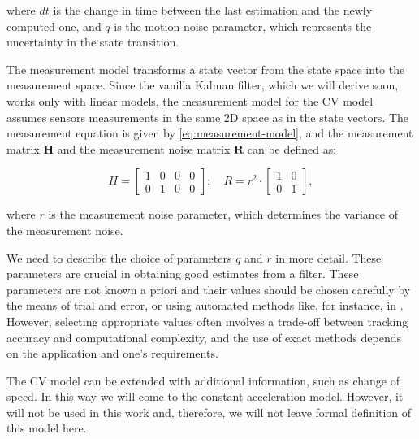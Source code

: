 \noindent where $dt$ is the change in time between the last estimation and the newly computed one, and $q$ is the motion noise parameter, which represents the uncertainty in the state transition.

The measurement model transforms a state vector from the state space into the measurement space. Since the vanilla Kalman filter, which we will derive soon, works only with linear models, the measurement model for the CV model assumes sensors measurements in the same 2D space as in the state vectors. The measurement equation is given by \ref{eq:measurement-model}, and the measurement matrix $\mathbf{H}$ and the measurement noise matrix $\mathbf{R}$ can be defined as:

\begin{equation}
    H =
    \begin{bmatrix}
        1 & 0 &0 & 0 \\
        0 & 1 &0 & 0
    \end{bmatrix};
    \quad
    R =
    r^{2}\cdot
    \begin{bmatrix}
        1 & 0 \\
        0 & 1
    \end{bmatrix},
\end{equation}

\noindent where $r$ is the measurement noise parameter, which determines the variance of the measurement noise.

We need to describe the choice of parameters $q$ and $r$ in more detail. These parameters are crucial in obtaining good estimates from a filter. These parameters are not known a priori and their values should be chosen carefully by the means of trial and error, or using automated methods like, for instance, in \cite{bulutProcessMeasurementNoise2011}. However, selecting appropriate values often involves a trade-off between tracking accuracy and computational complexity, and the use of exact methods depends on the application and one's requirements.

The CV model can be extended with additional information, such as change of speed. In this way we will come to the constant acceleration model. However, it will not be used in this work and, therefore, we will not leave formal definition of this model here.
